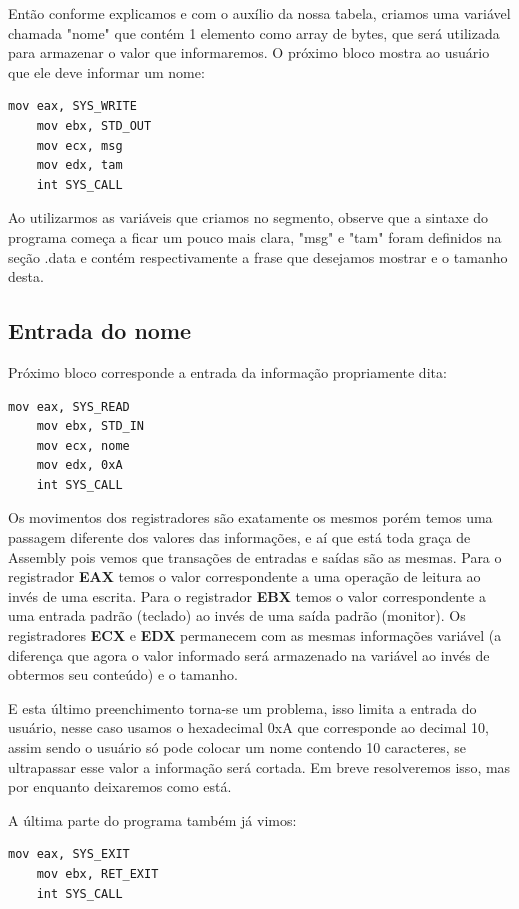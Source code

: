 Então conforme explicamos e com o auxílio da nossa tabela, criamos uma variável chamada "nome" que contém 1 elemento como array de bytes, que será utilizada para armazenar o valor que informaremos. O próximo bloco mostra ao usuário que ele deve informar um nome:
\begin{lstlisting}[]
	mov eax, SYS_WRITE
	mov ebx, STD_OUT
	mov ecx, msg
	mov edx, tam
	int SYS_CALL
\end{lstlisting}

Ao utilizarmos as variáveis que criamos no segmento, observe que a sintaxe do programa começa a ficar um pouco mais clara, "msg" e "tam" foram definidos na seção .data e contém respectivamente a frase que desejamos mostrar e o tamanho desta.

\subsection{Entrada do nome}

Próximo bloco corresponde a entrada da informação propriamente dita:
\begin{lstlisting}[]
	mov eax, SYS_READ
	mov ebx, STD_IN
	mov ecx, nome
	mov edx, 0xA
	int SYS_CALL
\end{lstlisting}

Os movimentos dos registradores são exatamente os mesmos porém temos uma passagem diferente dos valores das informações, e aí que está toda graça de Assembly pois vemos que transações de entradas e saídas são as mesmas. Para o registrador \textbf{EAX} temos o valor correspondente a uma operação de leitura ao invés de uma escrita. Para o registrador \textbf{EBX} temos o valor correspondente a uma entrada padrão (teclado) ao invés de uma saída padrão (monitor). Os registradores \textbf{ECX} e \textbf{EDX} permanecem com as mesmas informações variável (a diferença que agora o valor informado será armazenado na variável ao invés de obtermos seu conteúdo) e o tamanho.

E esta último preenchimento torna-se um problema, isso limita a entrada do usuário, nesse caso usamos o hexadecimal 0xA que corresponde ao decimal 10, assim sendo o usuário só pode colocar um nome contendo 10 caracteres, se ultrapassar esse valor a informação será cortada. Em breve resolveremos isso, mas por enquanto deixaremos como está.

A última parte do programa também já vimos:
\begin{lstlisting}[]
	mov eax, SYS_EXIT
	mov ebx, RET_EXIT
	int SYS_CALL
\end{lstlisting}

